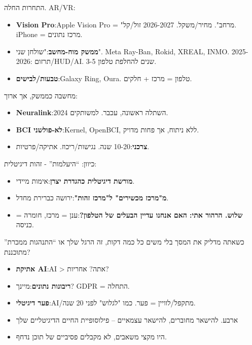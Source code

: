


התחרות החלה. AR/VR:

\begin{itemize}
  \item \textbf{Vision Pro}:Apple Vision Pro = "מרחב". מחיר/משקל. 2026-2027 זול/קל. iPhone = מרכז נתונים.
  \item \textbf{ממשק מוח-מחשב}:"שולחן שני". Meta Ray-Ban, Rokid, XREAL, INMO. 2025-2026: תרזום/HUD/AI. 3-5 שנים להחלפת טלפון.
  \item \textbf{טבעות/לבישים}:Galaxy Ring, Oura. טלפון = מרכז + חלקים.
\end{itemize}


מחשבה כממשק, אך ארוך:

\begin{itemize}
  \item \textbf{Neuralink}:2024 השתלה ראשונה, עכבר. למשותקים.
  \item \textbf{BCI לא-פולשני}:Kernel, OpenBCI, ללא ניתוח, אך פחות מדויק.
  \item \textbf{צרכני}:10-20 שנה. נגישות/ריכוז. אתיקה/פרטיות.
\end{itemize}


כיוון: “היעלמות” - זהות דיגיטלית:

\begin{itemize}
  \item \textbf{מורשת דיגיטלית כהגדרת יצרן}:אימות מיידי.
  \item \textbf{מ"מרכז מכשירים" ל"מרכז זהות"}:ירושה כברירת מחדל.
  \item \textbf{שלוש. הרהור אתי: האם אנחנו עדיין הבעלים של הטלפון?}:ענן = מרכז, חומרה = כניסה.
\end{itemize}


כשאתה מדליק את המסך בלי משים כל כמה דקות, זה הרגל שלך או “התנהגות ממכרת” מתוכננת?

\begin{itemize}
  \item \textbf{אתיקת AI}:AI > אתה? אחריות?
  \item \textbf{ריבונות נתונים}:מיינך? GDPR = התחלה.
  \item \textbf{פער דיגיטלי}:AI/מתקפל/לוויין = פער. כמו "לגלוש" לפני 20 שנה.
  \item ארבע. להישאר מחוברים, להישאר עצמאיים – פילוסופיית החיים הדיגיטליים שלך
  \item היו מקצי משאבים, לא מקבלים פסיביים של תוכן נדחף.
\end{itemize}

